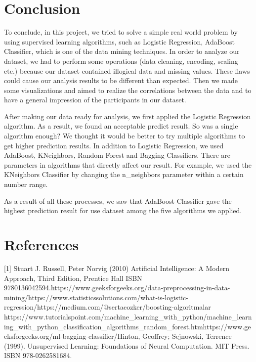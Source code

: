 \documentclass[onecolumn]{article}
\begin{document}
\section{Conclusion}
To conclude, in this project, we tried to solve a simple real world problem by using supervised learning algorithms, such as Logistic Regression, AdaBoost Classifier, which is one of the data mining techniques. In order to analyze our dataset, we had to perform some operations (data cleaning, encoding, scaling etc.) because our dataset contained illogical data and missing values. These flaws could cause our analysis results to be different than expected. Then we made some visualizations and aimed to realize the correlations between the data and to have a general impression of the participants in our dataset.

After making our data ready for analysis, we first applied the Logistic Regression algorithm. As a result, we found an acceptable predict result. So was a single algorithm enough? We thought it would be better to try multiple algorithms to get higher prediction results. In addition to Logistic Regression, we used AdaBoost, KNeighbors, Random Forest and Bagging Classifiers. There are parameters in algorithms that directly affect our result. For example, we used the KNeighbors Classifier by changing the n\_neighbors parameter within a certain number range.

As a result of all these processes, we saw that AdaBoost Classifier gave the highest prediction result for use dataset among the five algorithms we applied.

\section{References}
[1] Stuart J. Russell, Peter Norvig (2010) Artificial Intelligence: A Modern Approach, Third Edition, Prentice Hall ISBN 9780136042594.\newline
[2] https://www.geeksforgeeks.org/data-preprocessing-in-data-mining/\newline
[3] https://www.statisticssolutions.com/what-is-logistic-regression/\newline
[4] https://medium.com/@sertacozker/boosting-algoritmalar%
\newline[5] https://www.tutorialspoint.com/machine\_learning\_with\_python/machine\_learning\_with\_python\newline\_classification\_algorithms\_random\_forest.htm\newline
[6] https://www.geeksforgeeks.org/ml-bagging-classifier/\newline
[7] Hinton, Geoffrey; Sejnowski, Terrence (1999). Unsupervised Learning: Foundations of Neural Computation. MIT Press. ISBN 978-0262581684.\newline
\nocite{*}
\end{document}
